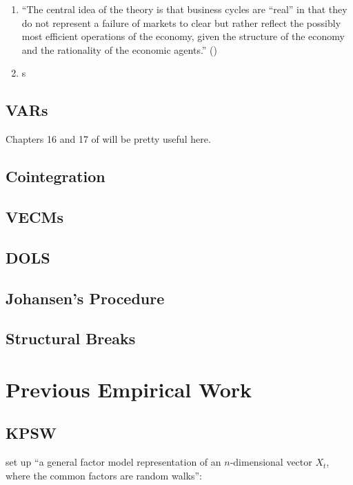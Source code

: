 \begin{enumerate}
  \item ``The central idea of the theory is that business cycles are “real” in that
they do not represent a failure of markets to clear but rather reflect the possibly most
efficient operations of the economy, given the structure of the economy and the
rationality of the economic agents.'' (\cite[p.8]{deng_real_2009})
\item s
\end{enumerate}


\subsection{VARs}

Chapters 16 and 17 of \cite{hansen_econometrics_2016} will be pretty useful here.


\subsection{Cointegration}

\subsection{VECMs}

\subsection{DOLS}

\subsection{Johansen's Procedure}

\subsection{Structural Breaks}





\section{Previous Empirical Work}

\subsection{KPSW}

\cite[p.11]{king_stochastic_1987} set up ``a general factor model representation of an $n$-dimensional vector $X_t$, where the common factors are random walks'':

